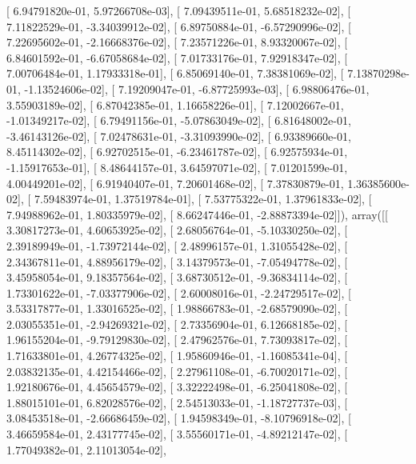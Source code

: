 \documentclass{article}
\begin{document}
       [  6.94791820e-01,   5.97266708e-03],
       [  7.09439511e-01,   5.68518232e-02],
       [  7.11822529e-01,  -3.34039912e-02],
       [  6.89750884e-01,  -6.57290996e-02],
       [  7.22695602e-01,  -2.16668376e-02],
       [  7.23571226e-01,   8.93320067e-02],
       [  6.84601592e-01,  -6.67058684e-02],
       [  7.01733176e-01,   7.92918347e-02],
       [  7.00706484e-01,   1.17933318e-01],
       [  6.85069140e-01,   7.38381069e-02],
       [  7.13870298e-01,  -1.13524606e-02],
       [  7.19209047e-01,  -6.87725993e-03],
       [  6.98806476e-01,   3.55903189e-02],
       [  6.87042385e-01,   1.16658226e-01],
       [  7.12002667e-01,  -1.01349217e-02],
       [  6.79491156e-01,  -5.07863049e-02],
       [  6.81648002e-01,  -3.46143126e-02],
       [  7.02478631e-01,  -3.31093990e-02],
       [  6.93389660e-01,   8.45114302e-02],
       [  6.92702515e-01,  -6.23461787e-02],
       [  6.92575934e-01,  -1.15917653e-01],
       [  8.48644157e-01,   3.64597071e-02],
       [  7.01201599e-01,   4.00449201e-02],
       [  6.91940407e-01,   7.20601468e-02],
       [  7.37830879e-01,   1.36385600e-02],
       [  7.59483974e-01,   1.37519784e-01],
       [  7.53775322e-01,   1.37961833e-02],
       [  7.94988962e-01,   1.80335979e-02],
       [  8.66247446e-01,  -2.88873394e-02]]), array([[  3.30817273e-01,   4.60653925e-02],
       [  2.68056764e-01,  -5.10330250e-02],
       [  2.39189949e-01,  -1.73972144e-02],
       [  2.48996157e-01,   1.31055428e-02],
       [  2.34367811e-01,   4.88956179e-02],
       [  3.14379573e-01,  -7.05494778e-02],
       [  3.45958054e-01,   9.18357564e-02],
       [  3.68730512e-01,  -9.36834114e-02],
       [  1.73301622e-01,  -7.03377906e-02],
       [  2.60008016e-01,  -2.24729517e-02],
       [  3.53317877e-01,   1.33016525e-02],
       [  1.98866783e-01,  -2.68579090e-02],
       [  2.03055351e-01,  -2.94269321e-02],
       [  2.73356904e-01,   6.12668185e-02],
       [  1.96155204e-01,  -9.79129830e-02],
       [  2.47962576e-01,   7.73093817e-02],
       [  1.71633801e-01,   4.26774325e-02],
       [  1.95860946e-01,  -1.16085341e-04],
       [  2.03832135e-01,   4.42154466e-02],
       [  2.27961108e-01,  -6.70020171e-02],
       [  1.92180676e-01,   4.45654579e-02],
       [  3.32222498e-01,  -6.25041808e-02],
       [  1.88015101e-01,   6.82028576e-02],
       [  2.54513033e-01,  -1.18727737e-03],
       [  3.08453518e-01,  -2.66686459e-02],
       [  1.94598349e-01,  -8.10796918e-02],
       [  3.46659584e-01,   2.43177745e-02],
       [  3.55560171e-01,  -4.89212147e-02],
       [  1.77049382e-01,   2.11013054e-02],
\end{document}
